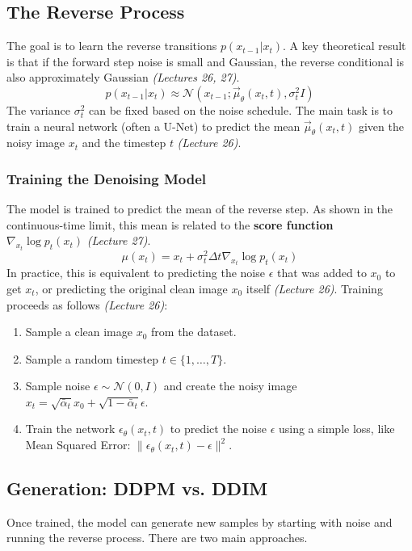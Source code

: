 \documentclass[11pt]{article}
\begin{document}
\subsection{The Reverse Process}
The goal is to learn the reverse transitions $p(x_{t-1}|x_t)$. A key theoretical result is that if the forward step noise is small and Gaussian, the reverse conditional is also approximately Gaussian \textit{(Lectures 26, 27)}.
\[ p(x_{t-1} | x_t) \approx \mathcal{N}(x_{t-1}; \vec{\mu}_{\theta}(x_t, t), \sigma_t^2 I) \]
The variance $\sigma_t^2$ can be fixed based on the noise schedule. The main task is to train a neural network (often a U-Net) to predict the mean $\vec{\mu}_{\theta}(x_t, t)$ given the noisy image $x_t$ and the timestep $t$ \textit{(Lecture 26)}.

\subsubsection{Training the Denoising Model}
The model is trained to predict the mean of the reverse step. As shown in the continuous-time limit, this mean is related to the \textbf{score function} $\nabla_{x_t} \log p_t(x_t)$ \textit{(Lecture 27)}.
\[ \mu(x_t) = x_t + \sigma_t^2 \Delta t \nabla_{x_t} \log p_t(x_t) \]
In practice, this is equivalent to predicting the noise $\epsilon$ that was added to $x_0$ to get $x_t$, or predicting the original clean image $x_0$ itself \textit{(Lecture 26)}. Training proceeds as follows \textit{(Lecture 26)}:
\begin{enumerate}
    \item Sample a clean image $x_0$ from the dataset.
    \item Sample a random timestep $t \in \{1, \dots, T\}$.
    \item Sample noise $\epsilon \sim \mathcal{N}(0, I)$ and create the noisy image $x_t = \sqrt{\bar{\alpha}_t}x_0 + \sqrt{1-\bar{\alpha}_t}\epsilon$.
    \item Train the network $\epsilon_\theta(x_t, t)$ to predict the noise $\epsilon$ using a simple loss, like Mean Squared Error: $\|\epsilon_\theta(x_t, t) - \epsilon\|^2$.
\end{enumerate}

\subsection{Generation: DDPM vs. DDIM}
Once trained, the model can generate new samples by starting with noise and running the reverse process. There are two main approaches.
\end{document}
